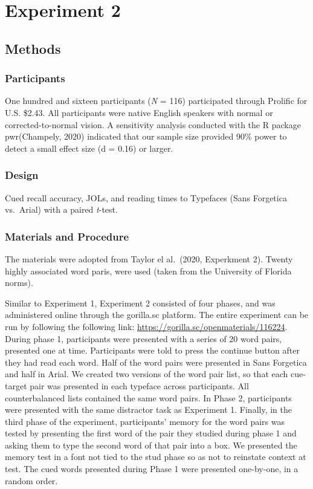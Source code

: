 \documentclass[
  english,
  man]{apa6}
\begin{document}
\hypertarget{experiment-2}{%
\section{Experiment 2}\label{experiment-2}}

\hypertarget{methods}{%
\subsection{Methods}\label{methods}}

\hypertarget{participants-1}{%
\subsubsection{Participants}\label{participants-1}}

One hundred and sixteen participants (\emph{N} = 116) participated through Prolific for U.S. \$2.43. All participants were native English speakers with normal or corrected-to-normal vision. A sensitivity analysis conducted with the R package pwr(Champely, 2020) indicated that our sample size provided 90\% power to detect a small effect size (d = 0.16) or larger.

\hypertarget{design-1}{%
\subsubsection{Design}\label{design-1}}

Cued recall accuracy, JOLs, and reading times to Typefaces (Sans Forgetica vs.~Arial) with a paired \emph{t}-test.

\hypertarget{materials-and-procedure}{%
\subsubsection{Materials and Procedure}\label{materials-and-procedure}}

The materials were adopted from Taylor el al.~(2020, Experkment 2). Twenty highly associated word paris, were used (taken from the University of Florida norms).

Similar to Experiment 1, Experiment 2 consisted of four phases, and was administered online through the gorilla.sc platform. The entire experiment can be run by following the following link: \url{https://gorilla.sc/openmaterials/116224}. During phase 1, participants were presented with a series of 20 word pairs, presented one at time. Participants were told to press the continue button after they had read each word. Half of the word pairs were presented in
Sans Forgetica and half in Arial. We created two versions of the word pair list, so that each cue-target pair was presented in each typeface across participants. All counterbalanced lists contained the same word pairs. In Phase 2, participants were presented with the same distractor task as Experiment 1. Finally, in the third phase of the experiment, participants' memory for the word pairs was tested by presenting the first word of the pair they studied during phase 1 and asking them to type the second word of that pair into a box. We presented the memory test in a font not tied to the stud phase so as not to reinstate context at test. The cued words presented during Phase 1 were presented one-by-one, in a random order.
\end{document}
